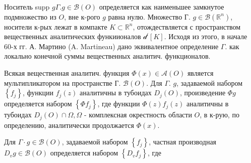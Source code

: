 \documentclass[10pt]{article}
\begin{document}
Носитель supp $g \Gamma . g \in \mathscr{B}(O)$ определяется как наименьшее замкнутое подмножество из $O$, вне к-рого $g$ равна нулю. Множество Г. $g \in \mathscr{B}\left(\mathbb{R}^{n}\right)$, носители к-рых лежат в компакте $K \subset \mathbb{R}^{n}$, отождествляется с пространством вещественных аналитических функиионалов $\mathcal{d}^{\prime}[K]$. Исходя из этого, в начале 60-х гг. А. Мартино (A. Martineau) дано эквивалентное определение $\Gamma$. как локально конечной суммы вещественных аналитич. функционалов.



Всякая вещественная аналитич. функция $\Phi(x) \in \mathscr{A}(O)$ является мультипликатором на пространстве Г. $\mathscr{B}(O)$. Для $\Gamma$. $g$, задаваемой набором $\left\{f_{j}\right\}$, функции $f_{j}(z)$ аналитичны в тубоидах $D_{j}(O)$, произведение $\Phi g$ определяется набором $\left\{\Phi f_{j}\right\}$, где функции $\Phi(z) f_{j}(z)$ аналитичны в тубоидах $D_{j}(O) \cap \Omega, \Omega$ - комплексная окрестность области $O$, в к-рую, по определению, аналитически продолжается $\Phi(x)$.



Для $\Gamma \cdot g \in \mathscr{B}(O)$, задаваемой набором $\left\{f_{j}\right\}$, частная производная $D_{v} g \in \mathscr{B}(O)$ определяется набором $\left\{D_{v} f_{j}\right\}$, где
\end{document}
